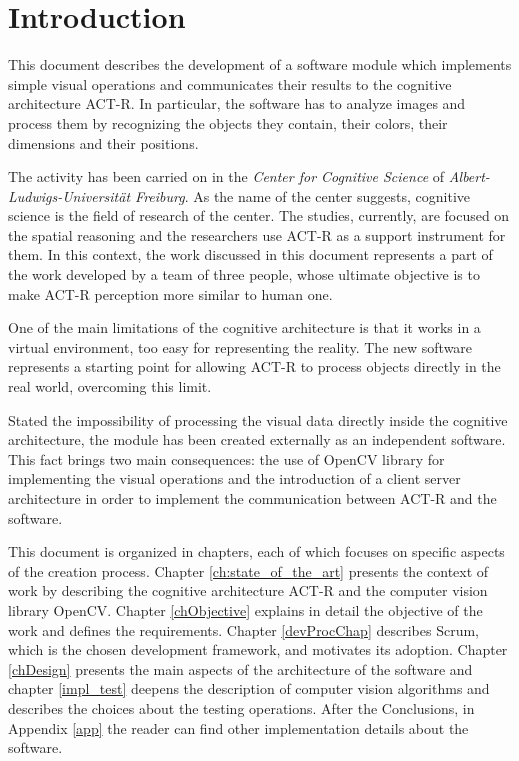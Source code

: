 \chapter{Introduction}
	This document describes the development of a software module which implements simple visual operations and communicates their results to the cognitive architecture \mbox{ACT-R}.
	In particular, the software has to analyze images and process them by recognizing the objects they contain, their colors, their dimensions and their positions.
	

	The activity has been carried on in the \emph{Center for Cognitive Science} of \emph{Albert-Ludwigs-Universität Freiburg}. 
	As the name of the center suggests, cognitive science is the field of research of the center.
	The studies, currently, are focused on the spatial reasoning and the researchers use \mbox{ACT-R} as a support instrument for them. 
	In this context, the work discussed in this document represents a part of the work developed by a team of three people, whose ultimate objective is to make \mbox{ACT-R} perception more similar to human one.

	One of the main limitations of the cognitive architecture is that it works in a virtual environment, too easy for representing the reality. 
	The new software represents a starting point for allowing \mbox{ACT-R} to process objects directly in the real world, overcoming this limit.
	
	Stated the impossibility of processing the visual data directly inside the cognitive architecture, the module has been created externally as an independent software.
	This fact brings two main consequences: the use of OpenCV library for implementing the visual operations and the introduction of a client server architecture in order to implement the communication between \mbox{ACT-R} and the software.

	
	This document is organized in chapters, each of which focuses on specific aspects of the creation process.
	Chapter \ref{ch:state_of_the_art} presents the context of work by describing the cognitive architecture \mbox{ACT-R} and the computer vision library \mbox{OpenCV}.
	Chapter \ref{chObjective} explains in detail the objective of the work and defines the requirements.
	Chapter \ref{devProcChap} describes Scrum, which is the chosen development framework, and motivates its adoption.%
	Chapter \ref{chDesign} presents the main aspects of the architecture of the software and chapter \ref{impl_test} deepens the description of computer vision algorithms and describes the choices about the testing operations.
	After the Conclusions, in Appendix \ref{app} the reader can find other implementation details about the software.

	
	
	
	
	
	

 	
	
